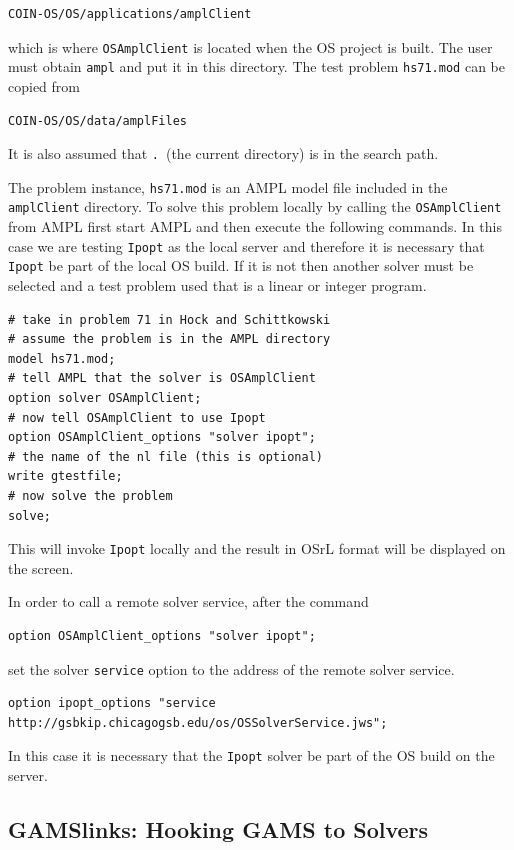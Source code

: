 \documentclass[11pt]{article}
\renewcommand{\_}{{\char"5F}}
\renewcommand{\{}{{\char"7B}}
\renewcommand{\}}{{\char"7D}}
\renewcommand{\^}{{\char"0D}}
\renewcommand{\'}{{\char"0D}}
\begin{document}
\begin{enumerate}[Step 1:]
\begin{verbatim}
COIN-OS/OS/applications/amplClient
\end{verbatim}
which is where {\tt OSAmplClient} is located when the OS project is built. The user must obtain {\tt ampl} and put
it in this directory.  The test problem {\tt hs71.mod} can be copied from

\begin{verbatim}
COIN-OS/OS/data/amplFiles
\end{verbatim}
It is also assumed that {\tt .}~(the current directory) is in the search path.

The  problem instance, {\tt hs71.mod} is an AMPL model file included in the {\tt amplClient} directory.
To solve this problem locally by calling the {\tt OSAmplClient} from AMPL first start AMPL and then
execute the following commands. In this case we are testing  {\tt Ipopt} as the
local server and therefore it is necessary that {\tt Ipopt} be part of the local OS build. If it is not
then another solver must be selected and a test problem used that is a linear or integer program.

\begin{verbatim}
# take in problem 71 in Hock and Schittkowski
# assume the problem is in the AMPL directory
model hs71.mod;
# tell AMPL that the solver is OSAmplClient
option solver OSAmplClient;
# now tell OSAmplClient to use Ipopt
option OSAmplClient_options "solver ipopt";
# the name of the nl file (this is optional)
write gtestfile;
# now solve the problem
solve;
\end{verbatim}

This will invoke {\tt Ipopt} locally and the result in OSrL format will be displayed on the screen.

In order to call a remote solver service, after the command
\begin{verbatim}
option OSAmplClient_options "solver ipopt";
\end{verbatim}
set the solver {\tt service} option to  the address of the remote solver service.
\begin{verbatim}
option ipopt_options "service http://gsbkip.chicagogsb.edu/os/OSSolverService.jws";
\end{verbatim}
In this case it is necessary that the {\tt Ipopt} solver be part of the OS build on the server.


\subsection{GAMSlinks:  Hooking GAMS to Solvers}\label{section:gamslinks}


\end{enumerate}
\end{document}
